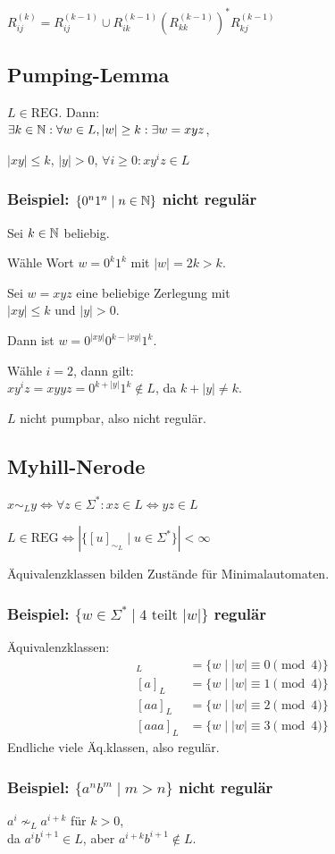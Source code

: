 $\displaystyle
R_{ij}^{(k)} = R_{ij}^{(k-1)} \cup R_{ik}^{(k-1)} \left( R_{kk}^{(k-1)} \right)^* R_{kj}^{(k-1)}
$

\subsection*{Pumping-Lemma}
$L \in \text{REG}$. Dann:\\
$\exists k \in \mathbb{N}:\forall w \in L, |w| \ge k: \exists w = xyz$,

$|xy| \le k$, $|y| > 0$, $\forall i \ge 0: xy^i z \in L$

\subsubsection*{Beispiel: $\{0^n 1^n \mid n \in \mathbb{N}\}$ nicht regulär}
Sei $k \in \mathbb{N}$ beliebig.

Wähle Wort $w=0^k 1^k$ mit $|w|=2k>k$.

Sei $w=xyz$ eine beliebige Zerlegung mit\\
$|xy| \le k$ und $|y| > 0$.

Dann ist $w = 0^{|xy|}0^{k-|xy|}1^k$.

Wähle $i=2$, dann gilt:\\
$xy^iz=xyyz=0^{k+|y|}1^k \notin L$, da $k+|y|\neq k$.

$L$ nicht pumpbar, also nicht regulär.

\subsection*{Myhill-Nerode}
$\displaystyle x \sim_L y \iff \forall z\in \Sigma^*: xz \in L \Leftrightarrow yz \in L$

$L \in \text{REG} \iff |\{[u]_{\sim_L} \mid u \in \Sigma^*\}| < \infty$

Äquivalenzklassen bilden Zustände für Minimalautomaten.

\subsubsection*{Beispiel: $\{w \in \Sigma^* \mid \text{4 teilt $|w|$}\}$ regulär}
Äquivalenzklassen:
\begin{align*}
	[\e]_L&=\{w \mid |w| \equiv 0 \pmod4\}\\
	[a]_L&=\{w \mid |w| \equiv 1 \pmod4\}\\
	[aa]_L&=\{w \mid |w| \equiv 2 \pmod4\}\\
	[aaa]_L&=\{w \mid |w| \equiv 3 \pmod4\}
\end{align*}
Endliche viele Äq.klassen, also regulär.

\subsubsection*{Beispiel: $\{a^n b^m \mid m > n\}$ nicht regulär}
$a^i \nsim_L a^{i+k}$ für $k > 0$,\\
da $a^i b^{i+1} \in L$, aber $a^{i+k}b^{i+1} \notin L$.
